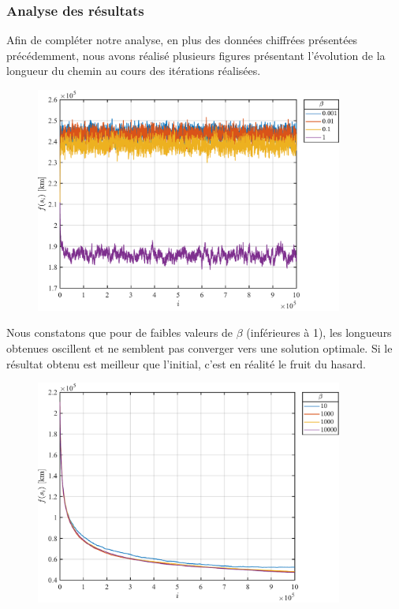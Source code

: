 \documentclass[a4paper, 12pt]{report}
\begin{document}
    \subsubsection{Analyse des résultats}
    Afin de compléter notre analyse, en plus des données chiffrées présentées précédemment, nous avons réalisé plusieurs figures présentant l'évolution de la longueur du chemin au cours des itérations réalisées.
    \begin{figure}[H]
        \centering
        \includegraphics[width=0.9\textwidth]{resources/pdf/belgium_bad_rand.pdf}
    \end{figure}
    Nous constatons que pour de faibles valeurs de $\beta$ (inférieures à 1), les longueurs obtenues oscillent et ne semblent pas converger vers une solution optimale. Si le résultat obtenu est meilleur que l'initial, c'est en réalité le fruit du hasard.
    \begin{figure}[H]
        \centering
        \includegraphics[width=0.9\textwidth]{resources/pdf/belgium_fine_rand.pdf}
    \end{figure}
\end{document}
